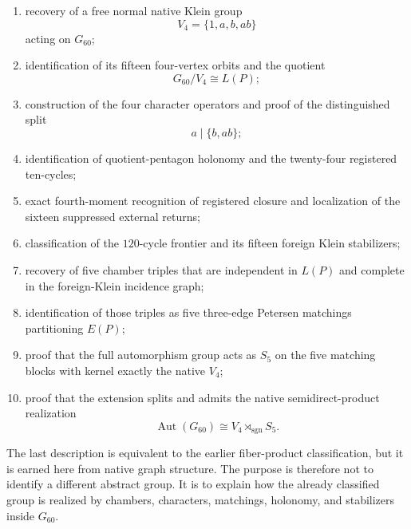 \begin{enumerate}
    \item recovery of a free normal native Klein group
    \[
    V_4=\{1,a,b,ab\}
    \]
    acting on \(G_{60}\);

    \item identification of its fifteen four-vertex orbits and the
    quotient
    \[
    G_{60}/V_4\cong L(P);
    \]

    \item construction of the four character operators and proof of
    the distinguished split
    \[
    a\mid\{b,ab\};
    \]

    \item identification of quotient-pentagon holonomy and the
    twenty-four registered ten-cycles;

    \item exact fourth-moment recognition of registered closure and
    localization of the sixteen suppressed external returns;

    \item classification of the \(120\)-cycle frontier and its fifteen
    foreign Klein stabilizers;

    \item recovery of five chamber triples that are independent in
    \(L(P)\) and complete in the foreign-Klein incidence graph;

    \item identification of those triples as five three-edge Petersen
    matchings partitioning \(E(P)\);

    \item proof that the full automorphism group acts as \(S_5\) on
    the five matching blocks with kernel exactly the native \(V_4\);

    \item proof that the extension splits and admits the native
    semidirect-product realization
    \[
    \operatorname{Aut}(G_{60})
    \cong
    V_4\rtimes_{\operatorname{sgn}}S_5.
    \]
\end{enumerate}

The last description is equivalent to the earlier fiber-product
classification, but it is earned here from native graph structure.
The purpose is therefore not to identify a different abstract group.
It is to explain how the already classified group is realized by
chambers, characters, matchings, holonomy, and stabilizers inside
\(G_{60}\).

